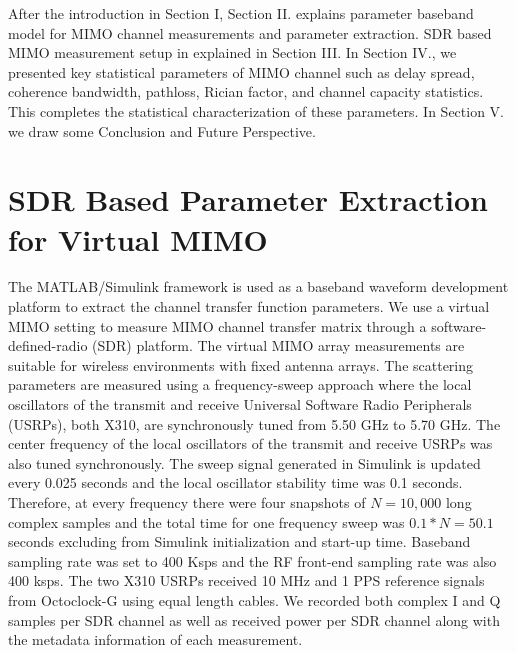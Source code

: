 \documentclass[10pt, final, journal, letterpaper, oneside, twocolumn]{IEEEtran}
\begin{document}
After the introduction in Section I, Section II. explains parameter baseband model for MIMO channel measurements and parameter extraction. SDR based MIMO measurement setup in explained in Section III. In Section IV., we presented key statistical parameters of MIMO channel such as delay spread, coherence bandwidth, pathloss, Rician factor, and channel capacity statistics. This completes the statistical characterization of these parameters. In Section V. we draw some Conclusion and Future Perspective.


\vspace{-0.35cm}
\section{SDR Based Parameter Extraction for Virtual MIMO}
The MATLAB/Simulink framework is used as a baseband waveform development platform to extract the channel transfer function parameters. We use a virtual MIMO setting to measure MIMO channel transfer matrix through a software-defined-radio (SDR) platform. The virtual MIMO array measurements are suitable for wireless environments with fixed antenna arrays. The scattering parameters are measured using a frequency-sweep approach where the local oscillators of the transmit and receive Universal Software Radio Peripherals (USRPs), both X310, are synchronously tuned from 5.50 GHz to 5.70 GHz. The center frequency of the local oscillators of the transmit and receive USRPs was also tuned synchronously. The sweep signal generated in Simulink is updated every 0.025 seconds and the local oscillator stability time was 0.1 seconds. Therefore, at every frequency there were four snapshots of $N=10,000$ long complex samples and the total time for one frequency sweep was $0.1*N=50.1$ seconds excluding from Simulink initialization and start-up time. 
Baseband sampling rate was set to 400 Ksps and the RF front-end sampling rate was also 400 ksps. The two X310 USRPs received 10 MHz and 1 PPS reference signals from Octoclock-G using equal length cables. We recorded both complex I and Q samples per SDR channel as well as received power per SDR channel along with the metadata information of each measurement.
\end{document}
